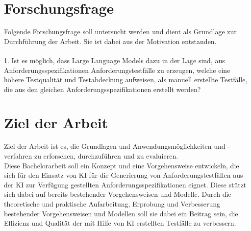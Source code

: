 \documentclass[12pt,toc=bib,toc=listof]{scrreprt}
\begin{document}
\section{Forschungsfrage} %
\label{sec:forschungsfrage}
Folgende Forschungsfrage soll untersucht werden und dient als Grundlage zur Durchführung der Arbeit. Sie ist dabei aus der Motivation entstanden.\\
\\
1. Ist es möglich, dass Large Language Models dazu in der Lage sind, aus Anforderungsspezifikationen Anforderungstestfälle zu erzeugen, welche eine höhere Testqualität und Testabdeckung aufweisen, als manuell erstellte Testfälle, die aus den gleichen Anforderungsspezifikationen erstellt werden?\\
\newpage

\noindent
\section{Ziel der Arbeit} %
\label{sec:zielDerArbeit}
Ziel der Arbeit ist es, die Grundlagen und Anwendungsmöglichkeiten und -verfahren zu erforschen, durchzuführen und zu evaluieren.\\
Diese Bachelorarbeit soll ein Konzept und eine Vorgehensweise entwickeln, die sich für den Einsatz von KI für die Generierung von Anforderungstestfällen aus der KI zur Verfügung gestellten Anforderungsspezifikationen eignet. Diese stützt sich dabei auf bereits bestehender Vorgehensweisen und Modelle. Durch die theoretische und praktische Aufarbeitung, Erprobung und Verbesserung bestehender Vorgehensweisen und Modellen soll sie dabei ein Beitrag sein, die Effizienz und Qualität der mit Hilfe von KI erstellten Testfälle zu verbessern.
\end{document}
